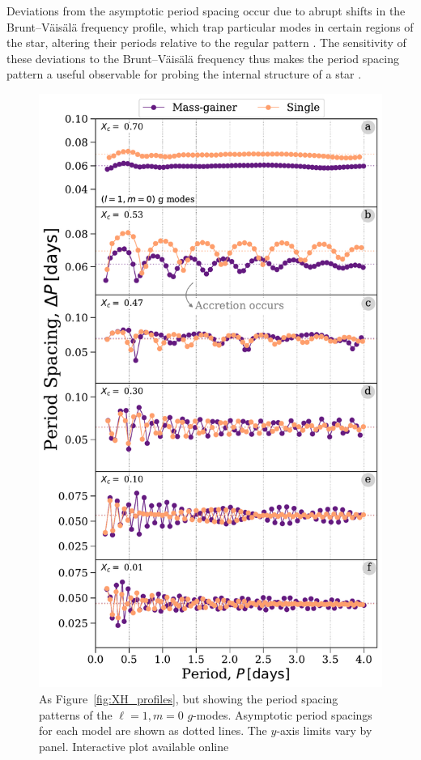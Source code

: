 \documentclass[desactivate]{aa}
\begin{document}
Deviations from the asymptotic period spacing occur due to abrupt shifts in the Brunt–Väisälä frequency profile, which trap particular modes in certain regions of the star, altering their periods relative to the regular pattern \citep[e.g.][]{Dziembowski1993,Miglio+2008}. The sensitivity of these deviations to the Brunt–Väisälä frequency thus makes the period spacing pattern a useful observable for probing the internal structure of a star \citep[e.g.][]{Aerts+2010}.

\begin{figure}%
    \centering
    \includegraphics[width=\columnwidth]{figures/period_spacing_mdm20.pdf}
    \caption{As Figure~\ref{fig:XH_profiles}, but showing the period spacing patterns of the $\ell = 1, m = 0$ $g$-modes. Asymptotic period spacings for each model are shown as dotted lines. The $y$-axis limits vary by panel. Interactive plot available online \href{www.tomwagg.com/html/interact/mass-gainer-asteroseismology.html\#fig5}{\faChartArea}}
    \label{fig:period_spacing}
\end{figure}
\end{document}
